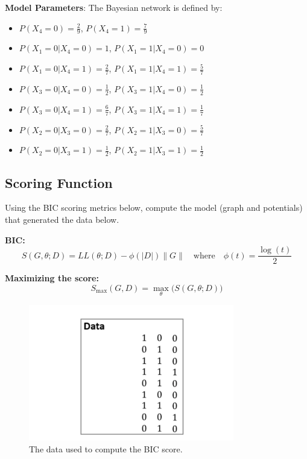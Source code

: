 \documentclass[a3paper,12pt]{extarticle} %
\begin{document}
\begin{enumerate}
\textbf{Model Parameters}:
The Bayesian network is defined by:
\begin{itemize}
    \item \(P(X_4 = 0) = \frac{2}{9}\), \(P(X_4 = 1) = \frac{7}{9}\)
    \item \(P(X_1 = 0 | X_4 = 0) = 1\), \(P(X_1 = 1 | X_4 = 0) = 0\)
    \item \(P(X_1 = 0 | X_4 = 1) = \frac{2}{7}\), \(P(X_1 = 1 | X_4 = 1) = \frac{5}{7}\)
    \item \(P(X_3 = 0 | X_4 = 0) = \frac{1}{2}\), \(P(X_3 = 1 | X_4 = 0) = \frac{1}{2}\)
    \item \(P(X_3 = 0 | X_4 = 1) = \frac{6}{7}\), \(P(X_3 = 1 | X_4 = 1) = \frac{1}{7}\)
    \item \(P(X_2 = 0 | X_3 = 0) = \frac{2}{7}\), \(P(X_2 = 1 | X_3 = 0) = \frac{5}{7}\)
    \item \(P(X_2 = 0 | X_3 = 1) = \frac{1}{2}\), \(P(X_2 = 1 | X_3 = 1) = \frac{1}{2}\)
\end{itemize}




\end{enumerate}

\subsection{Scoring Function}
Using the BIC scoring metrics below, compute the model (graph and potentials) that generated the data below. 

\textbf{BIC:}
\[
S(G, \theta; D) = LL(\theta; D) - \phi(|D|)\|G\| \quad \text{where} \quad \phi(t) = \frac{\log(t)}{2}
\]

\textbf{Maximizing the score:}
\[
S_{\text{max}}(G, D) = \max_{\theta} \big(S(G, \theta; D)\big)
\]

\begin{figure}[H]
\centering
\includegraphics[width=0.8\textwidth]{q2.png}
\caption{The data used to compute the BIC score.}
\label{fig:data}
\end{figure}
\end{document}
